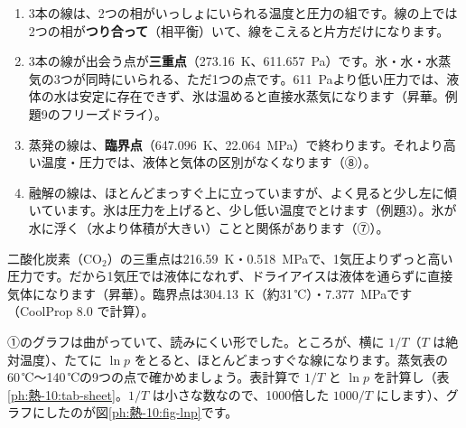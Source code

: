\begin{enumerate}[label={\bkcircled{\arabic*}}, leftmargin=2.4\zw, itemsep=1pt, topsep=2pt]
\item 3本の線は、2つの相がいっしょにいられる温度と圧力の組です。線の上では2つの相が\textbf{つり合って}（相平衡）いて、線をこえると片方だけになります。
\item 3本の線が出会う点が\textbf{三重点}（\qty{273.16}{K}、\qty{611.657}{Pa}）です。氷・水・水蒸気の3つが同時にいられる、ただ1つの点です。\qty{611}{Pa}より低い圧力では、液体の水は安定に存在できず、氷は温めると直接水蒸気になります（昇華。例題9のフリーズドライ）。
\item 蒸発の線は、\textbf{臨界点}（\qty{647.096}{K}、\qty{22.064}{MPa}）で終わります。それより高い温度・圧力では、液体と気体の区別がなくなります（⑧）。
\item 融解の線は、ほとんどまっすぐ上に立っていますが、よく見ると少し左に傾いています。氷は圧力を上げると、少し低い温度でとけます（例題3）。氷が水に浮く（水より体積が大きい）ことと関係があります（⑦）。
\end{enumerate}

\begin{seikaku}
二酸化炭素（CO$_2$）の三重点は\qty{216.59}{K}・\qty{0.518}{MPa}で、1気圧よりずっと高い圧力です。だから1気圧では液体になれず、ドライアイスは液体を通らずに直接気体になります（昇華）。臨界点は\qty{304.13}{K}（約31\,℃）・\qty{7.377}{MPa}です（CoolProp 8.0 で計算）。
\end{seikaku}


\label{ph:熱-10:sec3}
①のグラフは曲がっていて、読みにくい形でした。ところが、横に $1/T$（$T$ は絶対温度）、たてに $\ln p$ をとると、ほとんどまっすぐな線になります。蒸気表の60\,℃〜140\,℃の9つの点で確かめましょう。表計算で $1/T$ と $\ln p$ を計算し（表\ref{ph:熱-10:tab-sheet}。$1/T$ は小さな数なので、1000倍した $1000/T$ にします）、グラフにしたのが図\ref{ph:熱-10:fig-lnp}です。


